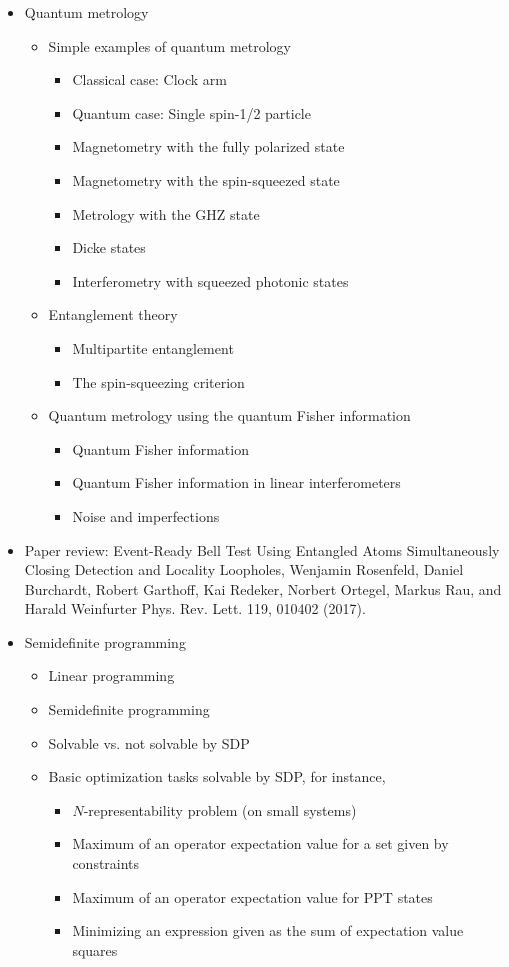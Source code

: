 \documentclass[11pt, oneside]{article}   	%
\begin{document}
\begin{itemize}
\item Quantum metrology
\begin{itemize}
\item Simple examples of quantum metrology
\begin{itemize}
\item Classical case: Clock arm
\item Quantum case: Single spin-1/2 particle
\item Magnetometry with the fully polarized state
\item Magnetometry with the spin-squeezed state
\item Metrology with the GHZ state
\item Dicke states
\item Interferometry with squeezed photonic states
\end{itemize}
\item Entanglement theory
\begin{itemize}
\item Multipartite entanglement
\item The spin-squeezing criterion
\end{itemize}
\item Quantum metrology using the quantum Fisher information
\begin{itemize}
\item Quantum Fisher information
\item Quantum Fisher information in linear interferometers
\item Noise and imperfections
\end{itemize}
\end{itemize}

\item Paper review: Event-Ready Bell Test Using Entangled Atoms Simultaneously Closing Detection and Locality Loopholes, Wenjamin Rosenfeld, Daniel Burchardt, Robert Garthoff, Kai Redeker, Norbert Ortegel, Markus Rau, and Harald Weinfurter
Phys. Rev. Lett. 119, 010402 (2017).

\item Semidefinite programming
\begin{itemize}
\item Linear programming
\item Semidefinite programming
\item Solvable vs. not solvable by SDP
\item Basic optimization tasks solvable by SDP, for instance,
\begin{itemize}
\item $N$-representability problem (on small systems)
\item Maximum of an operator expectation value for a set given by constraints
\item Maximum of an operator expectation value for PPT states
\item Minimizing an expression given as the sum of expectation value squares
\end{itemize}
\end{itemize}
 
\end{itemize}
\end{document}
